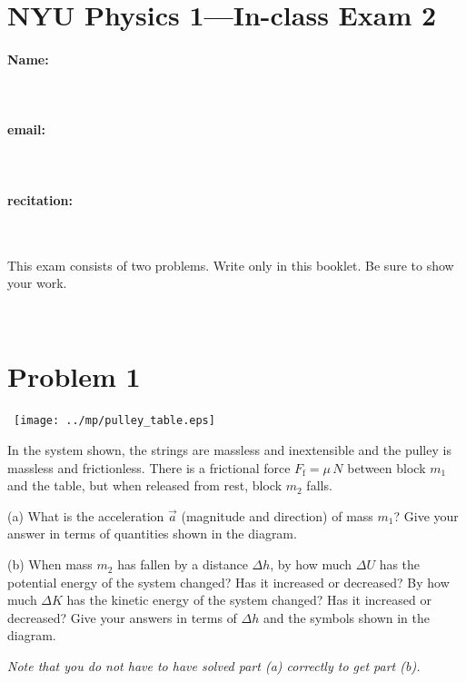 \documentclass[12pt]{article}
\begin{document}
\section*{NYU Physics 1---In-class Exam 2}

\vfill

\paragraph{Name:} ~

\paragraph{email:} ~

\paragraph{recitation:} ~

\vfill

This exam consists of two problems.  Write only in this booklet.  Be
sure to show your work.

\vfill ~

\clearpage

\section*{Problem 1}

\noindent~\hfill\texttt{[image: ../mp/pulley\_table.eps]}\hfill~

In the system shown, the strings are massless and inextensible and the
pulley is massless and frictionless.  There is a frictional force
$F_\mathrm{f}=\mu\,N$ between block $m_1$ and the table, but when
released from rest, block $m_2$ falls.

(a) What is the acceleration $\vec{a}$ (magnitude and direction) of
mass $m_1$?  Give your answer in terms of quantities shown in the
diagram.

\vfill

(b) When mass $m_2$ has fallen by a distance $\Delta h$, by how much
$\Delta U$ has the potential energy of the system changed?  Has it
increased or decreased?  By how much $\Delta K$ has the kinetic energy
of the system changed?  Has it increased or decreased?  Give your
answers in terms of $\Delta h$ and the symbols shown in the diagram.

\vfill

\emph{Note that you do not have to have solved part (a) correctly to
get part (b).}
\end{document}
